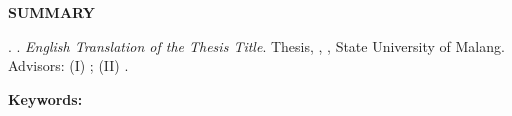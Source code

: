 %
%

\clearpage
{}

\begin{center}
    \bfseries SUMMARY
\end{center}

\begin{singlespace}

\noindent \penulis. \bulantahun. \textit{English Translation of the Thesis Title}. Thesis, \departemen, \fakultas, State University of Malang. Advisors: (I) \pembimbingSatu; (II) \pembimbingDua.

\vspace{0.5\baselineskip}
\noindent \textbf{Keywords:} \katakunciEn%

\vspace{\baselineskip}
\blindtext%

\end{singlespace}
\clearpage
